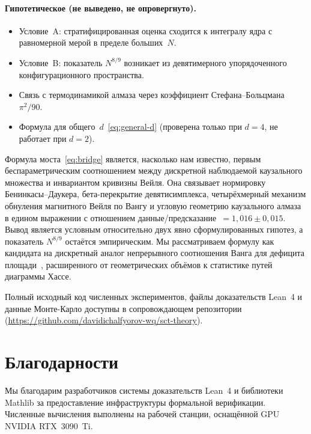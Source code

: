 \documentclass[12pt,a4paper]{article}
\theoremstyle{plain}
\theoremstyle{definition}
\theoremstyle{remark}
\begin{document}
\paragraph{Гипотетическое (не выведено, не опровергнуто).}
\begin{itemize}
\item Условие~A: стратифицированная оценка сходится к
  интегралу ядра с равномерной мерой в пределе больших~$N$.
\item Условие~B: показатель $N^{8/9}$ возникает из
  девятимерного упорядоченного конфигурационного пространства.
\item Связь с термодинамикой алмаза через коэффициент
  Стефана--Больцмана $\pi^2/90$.
\item Формула для общего~$d$~\eqref{eq:general-d}
  (проверена только при $d = 4$, не работает при $d = 2$).
\end{itemize}

\bigskip

Формула моста~\eqref{eq:bridge} является, насколько нам
известно, первым беспараметрическим соотношением между
дискретной наблюдаемой каузального множества и инвариантом
кривизны Вейля.  Она связывает нормировку
Бенинкасы--Даукера, бета-перекрытие девятисимплекса,
четырёхмерный механизм обнуления магнитного Вейля по Вангу
и угловую геометрию каузального алмаза в едином выражении
с отношением данные/предсказание~$= 1{,}016 \pm 0{,}015$.
Вывод является условным относительно двух явно
сформулированных гипотез, а показатель $N^{8/9}$ остаётся
эмпирическим.  Мы рассматриваем формулу как кандидата на
дискретный аналог непрерывного соотношения Ванга для
дефицита площади~\cite{Wang:2019}, расширенного от
геометрических объёмов к статистике путей диаграммы Хассе.

Полный исходный код численных экспериментов, файлы
доказательств Lean~4 и данные Монте-Карло доступны в
сопровождающем
репозитории~\cite{Alfyorov:2026repo}
(\url{https://github.com/davidichalfyorov-wq/sct-theory}).

\section*{Благодарности}

Мы благодарим разработчиков системы доказательств Lean~4
и библиотеки Mathlib за предоставление инфраструктуры
формальной верификации.  Численные вычисления выполнены
на рабочей станции, оснащённой GPU NVIDIA RTX~3090~Ti.
\end{document}
